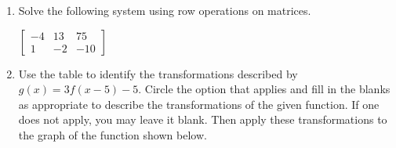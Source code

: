 \documentclass[11pt]{article}
\begin{document}
\begin{enumerate}
% 

\item %
\providecommand{\stxKnowl}{}\renewcommand{\stxKnowl}[1]{#1}
\providecommand{\stxOuttro}{}\renewcommand{\stxOuttro}[1]{#1}
\providecommand{\stxTitle}{}\renewcommand{\stxTitle}[1]{#1}
\renewcommand{\stxOuttro}[1]{}
\stxKnowl{
Solve the following system using row operations on matrices.

\(\left[\begin{array}{cc|c} -4 & 13 & 75 \\ 1 & -2 & -10 \end{array}\right]\)

\stxOuttro{
Solution

\[\begin{aligned} & \left[\begin{array}{cc|c} -4 & 13 & 75 \\ 1 & -2 & -10 \end{array}\right] \\ \xrightarrow{R_1 \leftrightarrow R_2} & \left[\begin{array}{cc|c} 1 & -2 & -10 \\ -4 & 13 & 75 \end{array}\right] \\ \xrightarrow{R_2 + 4R_1 \to R_2} & \left[\begin{array}{cc|c} 1 & -2 & -10 \\ 0 & 5 & 35 \end{array}\right] \\ \xrightarrow{\frac{R_2}{5} \to R_2} & \left[\begin{array}{cc|c} 1 & -2 & -10 \\ 0 & 1 & 7 \end{array}\right] \\ \xrightarrow{R_1 + 2R_2 \to R_1} & \left[\begin{array}{cc|c} 1 & 0 & 4 \\ 0 & 1 & 7 \end{array}\right] \end{aligned}\]

\(\boxed{ (4, 7) }\)

}
}

\newpage

% 

\item %
\providecommand{\stxKnowl}{}\renewcommand{\stxKnowl}[1]{#1}
\providecommand{\stxOuttro}{}\renewcommand{\stxOuttro}[1]{#1}
\providecommand{\stxTitle}{}\renewcommand{\stxTitle}[1]{#1}
\renewcommand{\stxOuttro}[1]{}
\stxKnowl{
 Use the table to identify the transformations described by \(g(x) = 3f(x - 5) - 5\). Circle the option that applies and fill in the blanks as appropriate to describe the transformations of the given function. If one does not apply, you may leave it blank. Then apply these transformations to the graph of the function shown below. 

}
\end{enumerate}
\end{document}
